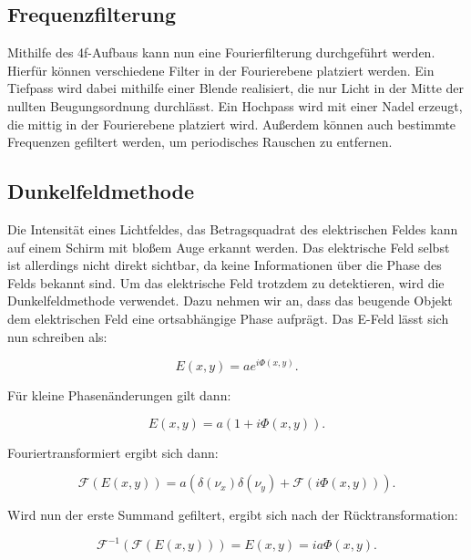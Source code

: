 \subsection{Frequenzfilterung}
Mithilfe des 4f-Aufbaus kann nun eine Fourierfilterung durchgeführt werden. Hierfür können verschiedene Filter in der Fourierebene platziert werden. Ein Tiefpass wird dabei mithilfe einer Blende realisiert, die nur Licht in der Mitte der nullten Beugungsordnung durchlässt. Ein Hochpass wird mit einer Nadel erzeugt, die mittig in der Fourierebene platziert wird. Außerdem können auch bestimmte Frequenzen gefiltert werden, um periodisches Rauschen zu entfernen.

\subsection{Dunkelfeldmethode}
Die Intensität eines Lichtfeldes, das Betragsquadrat des elektrischen Feldes kann auf einem Schirm mit bloßem Auge erkannt werden. Das elektrische Feld selbst ist allerdings nicht direkt sichtbar, da keine Informationen über die Phase des Felds bekannt sind. Um das elektrische Feld trotzdem zu detektieren, wird die Dunkelfeldmethode verwendet. Dazu nehmen wir an, dass das beugende Objekt dem elektrischen Feld eine ortsabhängige Phase aufprägt. Das E-Feld lässt sich nun schreiben als:

\begin{equation}
	E(x, y) = a e^{i\Phi\left( x, y\right) }.
\end{equation}

Für kleine Phasenänderungen gilt dann:

\begin{equation}
	E(x, y) = a\left( 1 + i\Phi\left( x, y\right) \right) .
\end{equation}

Fouriertransformiert ergibt sich dann:

\begin{equation}
	\mathcal{F}\left( E\left( x, y\right) \right)  = a\left( \delta\left( \nu_x\right) \delta\left( \nu_y\right) + \mathcal{F}\left( i\Phi\left( x, y\right) \right) \right) .
\end{equation}

Wird nun der erste Summand gefiltert, ergibt sich nach der Rücktransformation:

\begin{equation}
	\mathcal{F}^{-1}\left( \mathcal{F}\left( E\left( x, y\right) \right) \right) = E\left( x, y\right) = ia\Phi\left( x, y\right) .
\end{equation}

